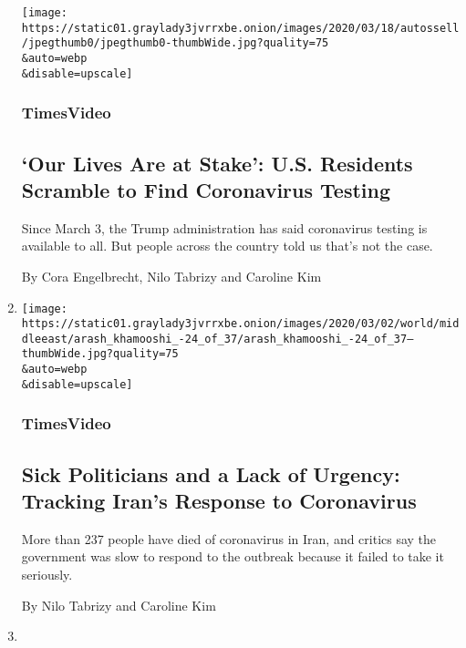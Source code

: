 \begin{enumerate}
  \texttt{[image: https://static01.graylady3jvrrxbe.onion/images/2020/03/18/autossell/jpegthumb0/jpegthumb0-thumbWide.jpg?quality=75\\\&auto=webp\\\&disable=upscale]}

  \hypertarget{timesvideo-5}{%
  \subsubsection{TimesVideo}\label{timesvideo-5}}

  \hypertarget{our-lives-are-at-stake-us-residents-scramble-to-find-coronavirus-testing}{%
  \subsection{`Our Lives Are at Stake': U.S. Residents Scramble to Find
  Coronavirus
  Testing}\label{our-lives-are-at-stake-us-residents-scramble-to-find-coronavirus-testing}}

  Since March 3, the Trump administration has said coronavirus testing
  is available to all. But people across the country told us that's not
  the case.

  By Cora Engelbrecht, Nilo Tabrizy and Caroline Kim
\item
  \href{/video/world/middleeast/100000007011860/iran-coronavirus-outbreak.html}{}

  \texttt{[image: https://static01.graylady3jvrrxbe.onion/images/2020/03/02/world/middleeast/arash\_khamooshi\_-24\_of\_37/arash\_khamooshi\_-24\_of\_37--thumbWide.jpg?quality=75\\\&auto=webp\\\&disable=upscale]}

  \hypertarget{timesvideo-6}{%
  \subsubsection{TimesVideo}\label{timesvideo-6}}

  \hypertarget{sick-politicians-and-a-lack-of-urgency-tracking-irans-response-to-coronavirus}{%
  \subsection{Sick Politicians and a Lack of Urgency: Tracking Iran's
  Response to
  Coronavirus}\label{sick-politicians-and-a-lack-of-urgency-tracking-irans-response-to-coronavirus}}

  More than 237 people have died of coronavirus in Iran, and critics say
  the government was slow to respond to the outbreak because it failed
  to take it seriously.

  By Nilo Tabrizy and Caroline Kim
\item
  \href{/interactive/2020/02/27/us/politics/black-church-elections.html}{}


\end{enumerate}
